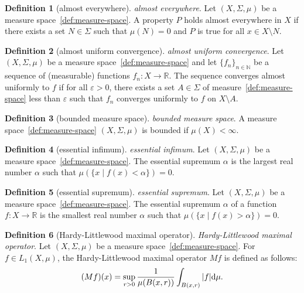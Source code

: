 \documentclass[12pt,a4paper]{article}
\theoremstyle{definition}
\newtheorem{definition}{Definition}
\begin{document}
\begin{definition}[almost everywhere]\label{def:almost-everywhere}
\emph{almost everywhere}. Let $(X,\Sigma,\mu)$ be a measure space~\ref{def:measure-space}. A property $P$ holds almost everywhere in $X$ if there exists a set $N \in \Sigma$ such that $\mu(N) = 0$ and $P$ is true for all $x \in X\setminus N$.
\end{definition}

\begin{definition}[almost uniform convergence]\label{def:almost-uniform-convergence}
\emph{almost uniform convergence}. Let $(X,\Sigma,\mu)$ be a measure space~\ref{def:measure-space} and let $\{f_n\}_{n\in\mathbb N}$ be a sequence of (measurable) functions $f_n: X\to \mathbb R$. The sequence converges almost uniformly to $f$ if for all $\varepsilon > 0$, there exists a set $A\in \Sigma$ of measure~\ref{def:measure-space} less than $\varepsilon$ such that $f_n$ converges uniformly to $f$ on $X\setminus A$.
\end{definition}

\begin{definition}[bounded measure space]\label{def:bounded-measure-space}
\emph{bounded measure space}. A measure space~\ref{def:measure-space} $(X,\Sigma, \mu)$ is bounded if $\mu(X) < \infty$.
\end{definition}

\begin{definition}[essential infimum]\label{def:essential-infimum}
\emph{essential infimum}. Let $(X,\Sigma, \mu)$ be a measure space~\ref{def:measure-space}. The essential supremum $\alpha$ is the largest real number $\alpha$ such that $\mu(\{x\mid f(x) < \alpha\}) = 0$.
\end{definition}

\begin{definition}[essential supremum]\label{def:essential-supremum}
\emph{essential supremum}. Let $(X,\Sigma, \mu)$ be a measure space~\ref{def:measure-space}. The essential supremum $\alpha$ of a function $f:X\to \mathbb R$ is the smallest real number $\alpha$ such that $\mu(\{x\mid f(x) > \alpha\}) = 0$.
\end{definition}

\begin{definition}[Hardy-Littlewood maximal operator]\label{def:hardy-littlewood-maximal-operator}
\emph{Hardy-Littlewood maximal operator}. Let $(X,\Sigma, \mu)$ be a measure space~\ref{def:measure-space}. For $f \in L_1(X,\mu)$, the Hardy-Littlewood maximal operator $Mf$ is defined as follows: $$(Mf)(x)=\sup_{r>0}\frac{1}{\mu(B(x,r))}\int_{B(x,r)}\vert f\vert \text d\mu.$$
\end{definition}
\end{document}
